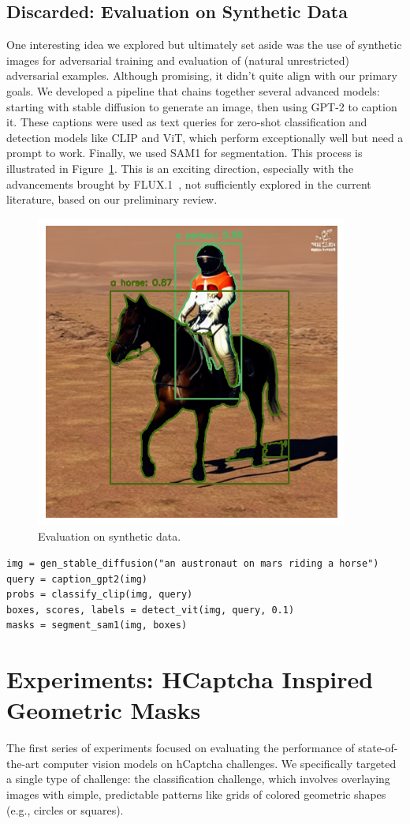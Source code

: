 \documentclass[a4paper, oneside]{discothesis}
\begin{document}
\subsection{Discarded: Evaluation on Synthetic Data}

One interesting idea we explored but ultimately set aside was the use of synthetic images for adversarial training and evaluation of (natural unrestricted) adversarial examples. Although promising, it didn't quite align with our primary goals. We developed a pipeline that chains together several advanced models: starting with stable diffusion to generate an image, then using GPT-2 to caption it. These captions were used as text queries for zero-shot classification and detection models like CLIP and ViT, which perform exceptionally well but need a prompt to work. Finally, we used SAM1 for segmentation. This process is illustrated in Figure~\ref{fig:chained}. This is an exciting direction, especially with the advancements brought by FLUX.1~\cite{BlackForestLabs2024FLUX}, not sufficiently explored in the current literature, based on our preliminary review.

\begin{figure}
	\centering
	\includegraphics[width=0.3\columnwidth]{figures/chained.png}
	\caption{Evaluation on synthetic data.}
	\label{fig:chained}
\end{figure}

\begin{verbatim}
img = gen_stable_diffusion("an austronaut on mars riding a horse")
query = caption_gpt2(img)
probs = classify_clip(img, query)
boxes, scores, labels = detect_vit(img, query, 0.1)
masks = segment_sam1(img, boxes)
\end{verbatim}

\section{Experiments: HCaptcha Inspired Geometric Masks}

The first series of experiments focused on evaluating the performance of state-of-the-art computer vision models on hCaptcha challenges. We specifically targeted a single type of challenge: the classification challenge, which involves overlaying images with simple, predictable patterns like grids of colored geometric shapes (e.g., circles or squares).
\end{document}
